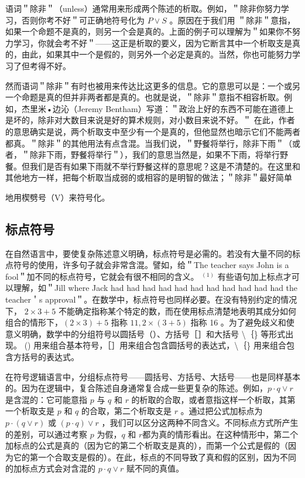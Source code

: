 语词＂除非＂（unless）通常用来形成两个陈述的析取。例如，＂除非你努力学习，否则你考不好＂可正确地符号化为 $P \vee S$ 。原因在于我们用 ＂除非＂意指，如果一个命题不是真的，则另一个会是真的。上面的例子可以理解为＂如果你不努力学习，你就会考不好＂——这正是析取的要义，因为它断言其中一个析取支是真的，由此，如果其中一个是假的，则另外一个必定是真的。当然，你也可能努力学习了但考得不好。

然而语词＂除非＂有时也被用来传达比这更多的信息。它的意思可以是：一个或另一个命题是真的但并非两者都是真的。也就是说，＂除非＂意指不相容析取。例如，杰里米•边沁（Jeremy Bentham）写道：＂政治上好的东西不可能在道德上是坏的，除非对大数目来说是好的算术规则，对小数目来说不好。＂\cite{hume1748} 在此，作者的意思确实是说，两个析取支中至少有一个是真的，但他显然也暗示它们不能两者都真。＂除非＂的其他用法有点含混。当我们说，＂野餐将举行，除非下雨＂（或者，＂除非下雨，野餐将举行＂），我们的意思当然是，如果不下雨，将举行野餐。但我们是否有如果下雨就不举行野餐这样的意思呢？这是不清楚的。在这里和其他地方一样，把每个析取当成弱的或相容的是明智的做法；＂除非＂最好简单

地用楔劈号（V）来符号化。

\subsection{标点符号}
在自然语言中，要使复杂陈述意义明确，标点符号是必需的。若没有大量不同的标点符号的使用，许多句子就会非常含混。譬如，给＂The teacher says John is a fool＂加不同的标点符号，它就会有很不相同的含义。 ${ }^{(1)}$ 有些语句加上标点才可以理解，如＂Jill where Jack had had had had had had had had had had had the teacher＇s approval＂。在数学中，标点符号也同样必要。在没有特别约定的情况下， $2 \times 3+5$ 不能确定指称某个特定的数，而在使用标点清楚地表明其成分如何组合的情形下，$(2 \times 3)+5$ 指称 $11,2 \times(3+5)$ 指称 16 。为了避免歧义和使意义明确，数学中的分组符号以圆括号（）、方括号［］和大括号 \textbackslash ｛\} 等形式出现。 () 用来组合基本符号，［］用来组合包含圆括号的表达式，\textbackslash ｛\} 用来组合包含方括号的表达式。

在符号逻辑语言中，分组标点符号——圆括号、方括号、大括号——也是同样基本的。因为在逻辑中，复合陈述自身通常复合成一些更复杂的陈述。例如，$p \cdot q \vee r$ 是含混的：它可能意指 $p$ 与 $q$ 和 $r$ 的析取的合取，或者意指这样一个析取，其第一个析取支是 $p$ 和 $q$ 的合取，第二个析取支是 $r$ 。通过把公式加标点为 $p \cdot(q \vee r)$ 或 $(p \cdot q) \vee r$ ，我们可以区分这两种不同含义。不同标点方式所产生的差别，可以通过考察 $p$ 为假，$q$ 和 $r$都为真的情形看出。在这种情形中，第二个加标点的公式是真的（因为它的第二个析取支是真的），而第一个公式是假的（因为它的第一个合取支是假的）。在此，标点的不同导致了真和假的区别，因为不同的加标点方式会对含混的 $p \cdot q \vee r$ 赋不同的真值。

